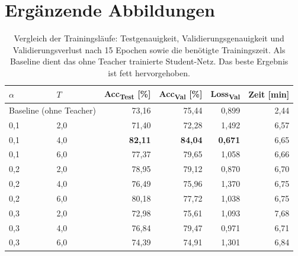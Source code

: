 \clearpage
\onecolumn
 
\setcounter{page}{1}
\maketitlesupplementary
 
\section{Ergänzende Abbildungen}
\label{sec:supp_figures}
 
\begin{table}[H]
	\centering
	\caption{Vergleich der Trainingsläufe: Testgenauigkeit, Validierungsgenauigkeit und Validierungsverlust nach 15 Epochen sowie die benötigte Trainingszeit. Als Baseline dient das ohne Teacher trainierte Student-Netz. Das beste Ergebnis ist fett hervorgehoben.}
	\label{tab:distillation_ergebnisse}
	\begin{tabular}{llrrrr}
		\toprule
		$\alpha$ & $T$ & Acc\textsubscript{Test} [\%] & Acc\textsubscript{Val} [\%] & Loss\textsubscript{Val} & Zeit [min] \\
		\midrule
		\multicolumn{2}{l}{Baseline (ohne Teacher)} & 73{,}16 & 75{,}44 & 0{,}899 & 2{,}44 \\
		\midrule
		0{,}1 & 2{,}0 & 71{,}40          & 72{,}28          & 1{,}492          & 6{,}57 \\
		0{,}1 & 4{,}0 & \textbf{82{,}11} & \textbf{84{,}04} & \textbf{0{,}671} & 6{,}65 \\
		0{,}1 & 6{,}0 & 77{,}37          & 79{,}65          & 1{,}058          & 6{,}66 \\
		0{,}2 & 2{,}0 & 78{,}95          & 79{,}12          & 0{,}870          & 6{,}70 \\
		0{,}2 & 4{,}0 & 76{,}49          & 75{,}96          & 1{,}370          & 6{,}75 \\
		0{,}2 & 6{,}0 & 80{,}18          & 77{,}72          & 1{,}038          & 6{,}75 \\
		0{,}3 & 2{,}0 & 72{,}98          & 75{,}61          & 1{,}093          & 7{,}68 \\
		0{,}3 & 4{,}0 & 76{,}84          & 79{,}47          & 0{,}971          & 6{,}71 \\
		0{,}3 & 6{,}0 & 74{,}39          & 74{,}91          & 1{,}301          & 6{,}84 \\
		\bottomrule
	\end{tabular}
\end{table}
 
\vspace{1.5em}
 
